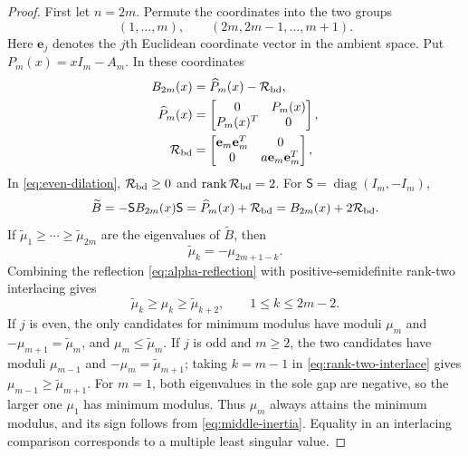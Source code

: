 \documentclass[preprints,article,accept,oneauthor]{Definitions/mdpi}
\numberwithin{equation}{section}
\theoremstyle{mdpi}
\theoremstyle{definition}
\DeclareMathOperator{\diag}{diag}
\begin{document}
\begin{proof}
First let \(n=2m\).  Permute the coordinates into the two groups
\[
 (1,\ldots,m),\qquad(2m,2m-1,\ldots,m+1).
\]
Here \(\mathbf e_j\) denotes the \(j\)th Euclidean coordinate vector in
the ambient space.  Put \(P_m(x)=xI_m-A_m\).  In these coordinates
\begin{equation}\label{eq:even-dilation}
\begin{aligned}
 B_{2m}(x)&=\widehat P_m(x)-\mathcal R_{\rm bd},\\
 \widehat P_m(x)&=\begin{bmatrix}0&P_m(x)\\P_m(x)^T&0\end{bmatrix},\\
 \mathcal R_{\rm bd}
 &=\begin{bmatrix}\mathbf e_m\mathbf e_m^T&0\\
 0&a \mathbf e_m\mathbf e_m^T\end{bmatrix},
\end{aligned}
\end{equation}
In \eqref{eq:even-dilation},
\(\mathcal R_{\rm bd}\geq0\) and
\(\operatorname{rank}\mathcal R_{\rm bd}=2\).  For
\(\mathsf S=\diag(I_m,-I_m)\),
\[
 \widetilde B=-\mathsf S B_{2m}(x)\mathsf S
 =\widehat P_m(x)+\mathcal R_{\rm bd}
 =B_{2m}(x)+2\mathcal R_{\rm bd}.
\]
If \(\widetilde\mu_1\geq\cdots\geq\widetilde\mu_{2m}\) are the
eigenvalues of
\(\widetilde B\), then
\begin{equation}\label{eq:alpha-reflection}
 \widetilde\mu_k=-\mu_{2m+1-k}.
\end{equation}
Combining the reflection \eqref{eq:alpha-reflection} with
positive-semidefinite rank-two interlacing gives
\begin{equation}\label{eq:rank-two-interlace}
 \widetilde\mu_k\geq\mu_k\geq\widetilde\mu_{k+2},
 \qquad1\leq k\leq2m-2.
\end{equation}
If \(j\) is even, the only candidates for minimum modulus
have moduli \(\mu_m\) and
\(-\mu_{m+1}=\widetilde\mu_m\), and
\(\mu_m\leq\widetilde\mu_m\).  If \(j\) is odd and \(m\geq2\), the two
candidates have moduli \(\mu_{m-1}\) and
\(-\mu_m=\widetilde\mu_{m+1}\); taking \(k=m-1\) in
\eqref{eq:rank-two-interlace} gives
\(\mu_{m-1}\geq\widetilde\mu_{m+1}\).  For \(m=1\), both eigenvalues in
the sole gap are negative, so the larger one \(\mu_1\) has minimum
modulus.  Thus \(\mu_m\) always attains the minimum modulus, and its
sign follows from \eqref{eq:middle-inertia}.  Equality in an interlacing
comparison corresponds to a multiple least singular value.


\end{proof}
\end{document}
